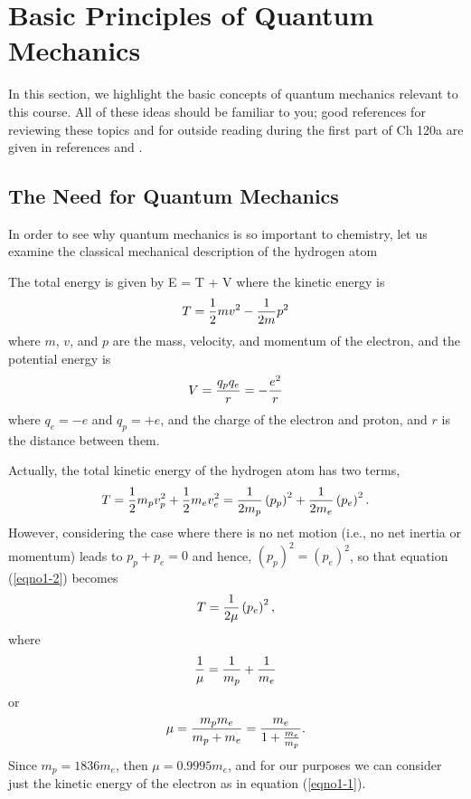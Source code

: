 \section{Basic Principles of Quantum Mechanics}
    
In this section, we highlight the basic concepts of quantum mechanics
relevant to this course. All of these ideas should be familiar to you; 
good references for reviewing these topics and for outside reading 
during the first part of Ch 120a are given in references
\cite{levineqm} and \cite{eyringqm}.

\subsection{The Need for Quantum Mechanics}
    
In order to see why quantum mechanics is so important to chemistry, let us 
examine the classical mechanical description of the hydrogen atom

The total energy is given by E = T + V where the kinetic energy is
\begin{equation}
T = {1 \over 2} mv^2 - {1 \over 2m} p^2
\label{eqno1-1}
\end{equation}
where $m$, $v$, and $p$ are the mass, velocity, and momentum of the electron,
and the potential energy is
\begin{equation}
V = {q_pq_e \over r} = - {e^2 \over r}
\end{equation}
where $q_e = -e$ and $q_p = +e$, and the charge of the electron and 
proton, and $r$ is the distance between them.  
    
Actually, the total kinetic energy of the hydrogen atom has two terms,
\begin{equation}
T = {1 \over 2} m_p v_p^2 + {1 \over 2} m_e v_e^2 = {1 \over 2m_p} \left( 
p_p \right)^2 + {1 \over 2m_e} \left( p_e \right)^2.
\label{eqno1-2}
\end{equation}
However, considering the case where there is no net motion (i.e., no net 
inertia or momentum) leads to $p_p + p_e = 0$ and hence, $(p_p)^2 = 
(p_e)^2$, so that equation (\ref{eqno1-2}) becomes
\begin{equation}
T = {1 \over 2 \mu} \left( p_e \right)^2,
\end{equation}
where
\begin{equation}
{1 \over \mu} = {1 \over m_p} + {1 \over m_e}
\end{equation}
or
\begin{equation}
\mu = {m_p m_e \over m_p + m_e} = {m_e \over 1 + {m_e \over m_p}}.
\end{equation}
Since $m_p = 1836 m_e$, then $\mu = 0.9995 m_e$, and for our purposes 
we can consider just the kinetic energy of the electron as in 
equation (\ref{eqno1-1}).
    

